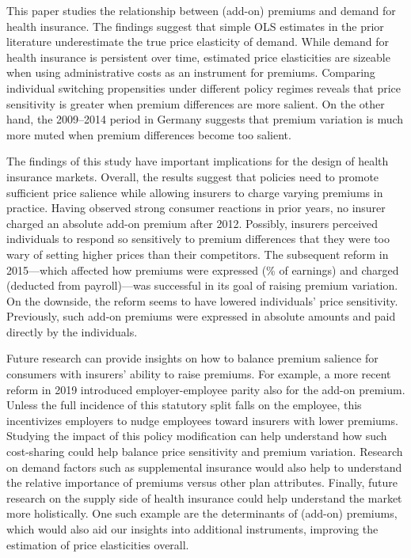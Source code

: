 \documentclass[a4paper, 11pt, english]{article}
\begin{document}
This paper studies the relationship between (add-on) premiums and demand for health insurance. The findings suggest that simple OLS estimates in the prior literature underestimate the true price elasticity of demand. While demand for health insurance is persistent over time, estimated price elasticities are sizeable when using administrative costs as an instrument for premiums. Comparing individual switching propensities under different policy regimes reveals that price sensitivity is greater when premium differences are more salient. On the other hand, the 2009--2014 period in Germany suggests that premium variation is much more muted when premium differences become too salient.

The findings of this study have important implications for the design of health insurance markets. Overall, the results suggest that policies need to promote sufficient price salience while allowing insurers to charge varying premiums in practice. Having observed strong consumer reactions in prior years, no insurer charged an absolute add-on premium after 2012. Possibly, insurers perceived individuals to respond so sensitively to premium differences that they were too wary of setting higher prices than their competitors. The subsequent reform in 2015---which affected how premiums were expressed (\% of earnings) and charged (deducted from payroll)---was successful in its goal of raising premium variation. On the downside, the reform seems to have lowered individuals' price sensitivity. Previously, such add-on premiums were expressed in absolute amounts and paid directly by the individuals.

Future research can provide insights on how to balance premium salience for consumers with insurers' ability to raise premiums. For example, a more recent reform in 2019 introduced employer-employee parity also for the add-on premium. Unless the full incidence of this statutory split falls on the employee, this incentivizes employers to nudge employees toward insurers with lower premiums. Studying the impact of this policy modification can help understand how such cost-sharing could help balance price sensitivity and premium variation. Research on demand factors such as supplemental insurance would also help to understand the relative importance of premiums versus other plan attributes. Finally, future research on the supply side of health insurance could help understand the market more holistically. One such example are the determinants of (add-on) premiums, which would also aid our insights into additional instruments, improving the estimation of price elasticities overall.
\end{document}
